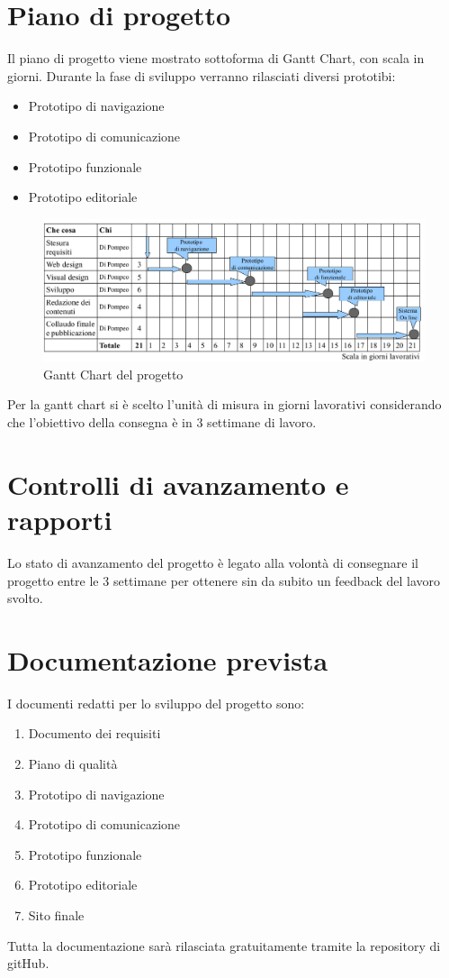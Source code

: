 \documentclass[a4paper,12pt,hidelinks]{report}
\begin{document}
\section{Piano di progetto}
Il piano di progetto viene mostrato sottoforma di Gantt Chart, con scala in giorni. Durante la fase di sviluppo verranno rilasciati diversi prototibi:
\begin{itemize}
 \item Prototipo di navigazione
 \item Prototipo di comunicazione
 \item Prototipo funzionale
 \item Prototipo editoriale
\end{itemize}
\begin{figure}[h!]%
    \includegraphics[width=1.2\textwidth,keepaspectratio=true]{../img/gantt_chart}
    \centering
    \caption{Gantt Chart del progetto}%
    \label{fig:gantt_chart}%
\end{figure}
Per la gantt chart si è scelto l'unità di misura in giorni lavorativi considerando che l'obiettivo della consegna è in 3 settimane di lavoro. 

\section{Controlli di avanzamento e rapporti}
Lo stato di avanzamento del progetto è legato alla volontà di consegnare il progetto entre le 3 settimane per ottenere sin da subito un feedback del lavoro svolto.

\section{Documentazione prevista}
I documenti redatti per lo sviluppo del progetto sono: 
\begin{enumerate}
 \item Documento dei requisiti
 \item Piano di qualità
 \item Prototipo di navigazione
 \item Prototipo di comunicazione
 \item Prototipo funzionale
 \item Prototipo editoriale
 \item Sito finale
\end{enumerate}
Tutta la documentazione sarà rilasciata gratuitamente tramite la repository di gitHub.
\end{document}
